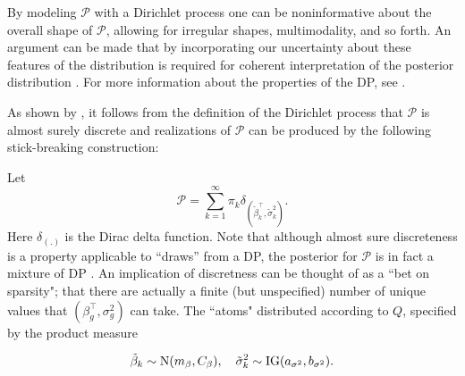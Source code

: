 \iftoggle{thesis}{
The use of this prior, due to \citet{ferguson}, is a distribution over probability distributions, such that for any finite disjoint partition $\{A_i\}_{i>=1}^n$ on $\mathbb{R}^p$, $\mathcal{P}$ is a random measure such that the joint distribution $\left(\mathcal{P}(A_1),\ldots,\mathcal{P}(A_n)\right) \sim \op{Dir}\left(\alpha Q(A_1),\ldots,\alpha Q(A_n)\right).$ The Dirichlet process has two parameters: $Q$, the base measure, represents a prior guess at the distribution. $\alpha$, the concentration parameter expresses the degree to which $\mathcal{P}$ will agree with $Q$ on any set $A$. This follows from the definition given above and known properties of the Dirichlet distribution, i.e., $\op{E}\left(\mathcal{P}(A)\right)=Q(A)$, and $\op{V}\left(\mathcal{P}(A)\right)=\frac{Q(A)(1 - Q(A)}{\alpha + 1}$, showing that $\mathcal{P}(A) \stackrel{p}{\rightarrow} Q(A)$ as $\alpha \rightarrow \infty$ for any set $A$. 
}{}
By modeling $\mathcal{P}$ with a Dirichlet process one can be noninformative about the overall shape of $\mathcal{P}$, allowing for irregular shapes, multimodality, and so forth. An argument can be made that by incorporating our uncertainty about these features of the distribution is required for coherent interpretation of the posterior distribution \citep{walker2010bayesian}. For more information about the properties of the DP, see \cite{ferguson}.

As shown by \citet{sethuraman}, it follows from the definition of the Dirichlet process that $\mathcal{P}$ is almost surely discrete and realizations of $\mathcal{P}$ can be produced by the following stick-breaking construction:

Let 
\begin{equation}
\mathcal{P} =\sum_{k=1}^\infty \pi_k \delta_{\left(\tilde{\beta}_k^\top ,\tilde{\sigma}^2_k\right)}.
\end{equation}
Here $\delta_{(.)}$ is the Dirac delta function. Note that although almost sure discreteness is a property applicable to ``draws'' from a DP, the posterior for $\mathcal{P}$ is in fact a mixture of DP \citep{antoniak}. An implication of discretness can be thought of as a ``bet on sparsity"; that there are actually a finite (but unspecified) number of unique values that $(\beta_g^\top,\sigma^2_g)$ can take.  
 The ``atoms" distributed according to $Q$, specified by the product measure

\begin{equation}
\tilde{\beta}_k \sim \operatorname{N}(m_\beta, C_\beta),\quad \tilde{\sigma}^2_k \sim \operatorname{IG}(a_{\sigma^2}, b_{\sigma^2}).
\end{equation}


